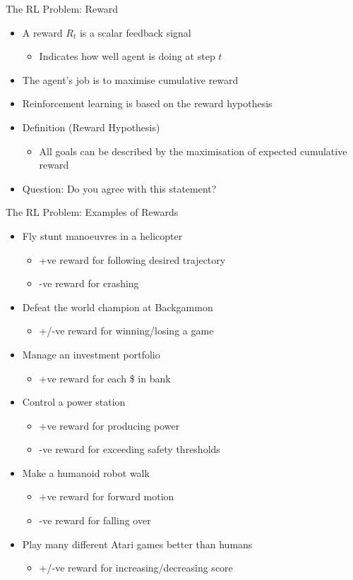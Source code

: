 \documentclass[presentation]{beamer}
\begin{document}
\begin{frame}[label={sec:orgc3ad2b2}]{The RL Problem: Reward}
\begin{itemize}
\item A reward \(R_t\) is a scalar feedback signal
\begin{itemize}
\item Indicates how well agent is doing at step \(t\)
\end{itemize}
\item The agent’s job is to maximise cumulative reward
\item Reinforcement learning is based on the \alert{reward hypothesis}
\item Definition (Reward Hypothesis)
\begin{itemize}
\item All goals can be described by the maximisation of expected cumulative reward
\end{itemize}
\item Question: Do you agree with this statement?
\end{itemize}
\end{frame}
\begin{frame}[label={sec:org0a849f8}]{The RL Problem: Examples of Rewards}
\begin{itemize}
\item Fly stunt manoeuvres in a helicopter
\begin{itemize}
\item +ve reward for following desired trajectory
\item -ve reward for crashing
\end{itemize}
\item Defeat the world champion at Backgammon
\begin{itemize}
\item +/-ve reward for winning/losing a game
\end{itemize}
\item Manage an investment portfolio
\begin{itemize}
\item +ve reward for each \$ in bank
\end{itemize}
\item Control a power station
\begin{itemize}
\item +ve reward for producing power
\item -ve reward for exceeding safety thresholds
\end{itemize}
\item Make a humanoid robot walk
\begin{itemize}
\item +ve reward for forward motion
\item -ve reward for falling over
\end{itemize}
\item Play many different Atari games better than humans
\begin{itemize}
\item +/-ve reward for increasing/decreasing score
\end{itemize}
\end{itemize}
\end{frame}
\end{document}
